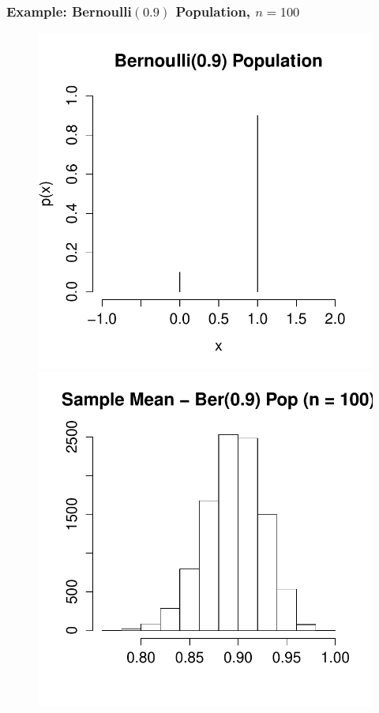 \documentclass[handout]{beamer}
\begin{document}
\begin{frame}
\frametitle{Example: Bernoulli$(0.9)$ Population, $n =100$}
\begin{figure}
\centering
\includegraphics[scale = 0.4]{./images/bernoulli_bad}
\includegraphics[scale = 0.4]{./images/xbar_bernoulli_fixed}
\end{figure}
\end{frame}
\end{document}
